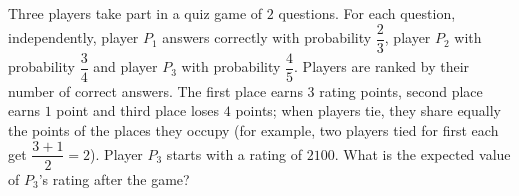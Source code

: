 Three players take part in a quiz game of $2$ questions. For each question, independently, player $P_1$ answers correctly with probability $\dfrac23$, player $P_2$ with probability $\dfrac34$ and player $P_3$ with probability $\dfrac45$. Players are ranked by their number of correct answers. The first place earns $3$ rating points, second place earns $1$ point and third place loses $4$ points; when players tie, they share equally the points of the places they occupy (for example, two players tied for first each get $\dfrac{3+1}2=2$). Player $P_3$ starts with a rating of $2100$. What is the expected value of $P_3$'s rating after the game?
